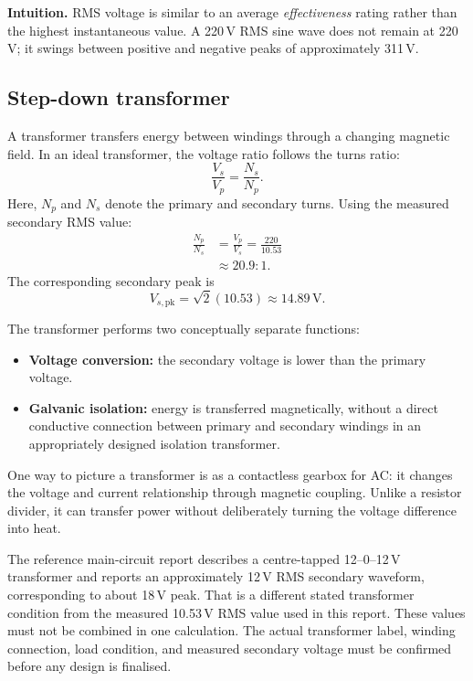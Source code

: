 \documentclass[journal,12pt,twocolumn]{IEEEtran}
\begin{document}
\textbf{Intuition.} RMS voltage is similar to an average
\emph{effectiveness} rating rather than the highest instantaneous
value. A 220\,V RMS sine wave does not remain at 220\,V; it swings
between positive and negative peaks of approximately 311\,V.

\subsection*{Step-down transformer}
A transformer transfers energy between windings through a changing
magnetic field. In an ideal transformer, the voltage ratio follows
the turns ratio:
\begin{equation}
    \boxed{\frac{V_s}{V_p}=\frac{N_s}{N_p}.}
    \label{eq:transformer-ratio}
\end{equation}
Here, $N_p$ and $N_s$ denote the primary and secondary turns. Using
the measured secondary RMS value:
\begin{align}
    \frac{N_p}{N_s}
    &=\frac{V_p}{V_s}
      =\frac{220}{10.53}\\
    &\approx 20.9:1.
\end{align}
The corresponding secondary peak is
\begin{equation}
    V_{s,\mathrm{pk}}=\sqrt{2}(10.53)
    \approx 14.89\,\mathrm{V}.
    \label{eq:secondary-peak}
\end{equation}

The transformer performs two conceptually separate functions:
\begin{itemize}[leftmargin=1.5em]
    \item \textbf{Voltage conversion:} the secondary voltage is lower
    than the primary voltage.
    \item \textbf{Galvanic isolation:} energy is transferred
    magnetically, without a direct conductive connection between
    primary and secondary windings in an appropriately designed
    isolation transformer.
\end{itemize}

One way to picture a transformer is as a contactless gearbox for AC:
it changes the voltage and current relationship through magnetic
coupling. Unlike a resistor divider, it can transfer power without
deliberately turning the voltage difference into heat.

The reference main-circuit report describes a centre-tapped
12--0--12\,V transformer and reports an approximately 12\,V RMS
secondary waveform, corresponding to about 18\,V peak. That is a
different stated transformer condition from the measured
10.53\,V RMS value used in this report. These values must not be
combined in one calculation. The actual transformer label, winding
connection, load condition, and measured secondary voltage must be
confirmed before any design is finalised.
\end{document}
